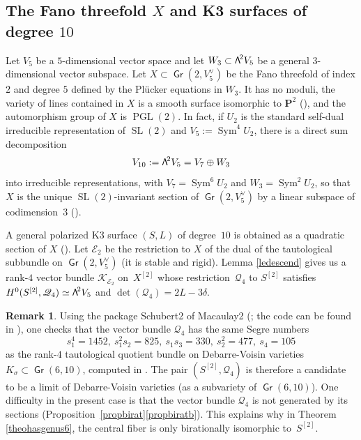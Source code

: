 \documentclass[11pt]{article}
\let\mathcal\mathscr
\theoremstyle{definition}
\newtheorem{rema}[lemm]{Remark}
\renewcommand\P{{\mathbf P}}\let\PP\P
\newcommand\cE{\mathcal{E}}
\newcommand\cK{\mathcal{K}}
\newcommand\cQ{\mathcal{Q}}\let\quotauto\cQ
\DeclareMathOperator{\Gr}{\mathsf{Gr}}
\let\isom\simeq
\let\dual\vee
\let\Ld L
\DeclareMathOperator{\PGL}{PGL}
\DeclareMathOperator{\Sym}{Sym}
\DeclareMathOperator{\SL}{SL}
\newcommand\bw[1]{{\hbox{\large$\mathsf{\Lambda}$}^{\!#1}}}
\newcommand\hilbS{S^{[2]}}
\begin{document}
\subsection{The Fano threefold $X$ and K3 surfaces of degree $10$}\label{secXg6}
Let $V_5$ be a $5$\nobreakdash-dim\-ensional vector space and let $W_3\subset \bw2 V_5$ be a general $3$-dimensional vector subspace.
Let $X\subset \Gr(2,V_5^\dual)$ be the Fano threefold of index $2$ and degree $5$ defined by the Plücker equations in $W_3$.
It has no moduli, the variety of lines contained in $X$ is a smooth surface isomorphic to
$\P^2$ (\cite[Cor.\,(6.6)(ii)]{iskovskikh}), and the automorphism group of $X$ is $\PGL(2)$. In fact, if $U_2$ is the standard self-dual irreducible representation of $\SL(2)$ and $V_5:=\Sym^4\! U_2$, there is a direct sum decomposition
\begin{equation}\label{eqdecompsl2}
V_{10}:=\bw2V_5= V_7 \oplus W_3
\end{equation}
into irreducible representations, with $V_7=\Sym^6\! U_2$ and $W_3=\Sym^2\! U_2$, so that $X$ is the unique $\SL(2)$-invariant section of $\Gr(2,V_5^\dual)$ by a linear subspace of codimension~$3$ (\cite[\S 7.1]{chsh}).

A general polarized K3 surface $(S,L)$ of degree~$10$ is obtained as a quadratic section of $X$ (\cite{mukai}).
Let $\cE_2$ be the restriction to $X$ of the dual of the tautological subbundle on $\Gr(2,V_5^\dual)$ (it is stable and rigid). Lemma \ref{ledescend} gives us a rank-$4$ vector bundle $ \cK_{\cE_2} $ on~$ X^{[2]}$ whose restriction~$\cQ_4 $ to $\hilbS$ satisfies
$H^0(\hilbS,\cQ_4)\isom \bw2V_5$ and $\det(\cQ_4)=2\Ld-3\delta$.

\begin{rema} \label{chernn}
Using the package
Schubert2 of Macaulay2 (\cite{macaulay2}; the code can be found in \cite{comp}), one checks that
the vector bundle $\cQ_4$ has the same Segre numbers
\[
s_1^4 = 1452,\ s_1^2 s_2 = 825,\
s_1 s_3= 330,\ s_2^2 = 477,\ s_4 = 105
\]
as the rank-$4$ tautological quotient bundle on Debarre-Voisin varieties
$K_\sigma\subset \Gr(6,10)$, computed in \cite[(11)]{devo}.
The pair
$(\hilbS,\cQ_4)$ is therefore a candidate to be a limit of Debarre-Voisin varieties (as a subvariety of $\Gr(6,10)$). One difficulty in the present
case is that
the vector bundle $\cQ_4$ is not generated by its sections (Proposition~\ref{propbirat}\eqref{propbiratb}). This explains why in Theorem \ref{theohasgenus6}, the
central fiber is only birationally isomorphic to~$\hilbS$.
\end{rema}
\end{document}
